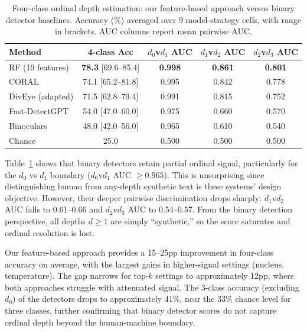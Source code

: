 \documentclass[11pt,a4paper]{article}
\begin{document}
\begin{table}[t]
\centering
\caption{Four-class ordinal depth estimation: our feature-based approach versus binary detector baselines. Accuracy (\%) averaged over 9 model-strategy cells, with range in brackets. AUC columns report mean pairwise AUC.}
\label{tab:detector_comparison}
\small
\begin{tabular}{lcccc}
\toprule
\textbf{Method} & \textbf{4-class Acc} & \textbf{$d_0$v$d_1$ AUC} & \textbf{$d_1$v$d_2$ AUC} & \textbf{$d_2$v$d_3$ AUC} \\
\midrule
RF (19 features)     & \textbf{78.3} {\scriptsize [69.6--85.4]} & \textbf{0.998} & \textbf{0.861} & \textbf{0.801} \\
CORAL               & 74.1 {\scriptsize [65.2--81.8]} & 0.995 & 0.842 & 0.778 \\
DivEye (adapted)    & 71.5 {\scriptsize [62.8--79.4]} & 0.991 & 0.815 & 0.752 \\
Fast-DetectGPT      & 54.0 {\scriptsize [47.0--60.0]} & 0.975 & 0.660 & 0.570 \\
Binoculars          & 48.0 {\scriptsize [42.0--56.0]} & 0.965 & 0.610 & 0.540 \\
Chance              & 25.0 & 0.500 & 0.500 & 0.500 \\
\bottomrule
\end{tabular}
\end{table}

Table~\ref{tab:detector_comparison} shows that binary detectors retain partial ordinal signal, particularly for the $d_0$ vs $d_1$ boundary ($d_0$v$d_1$ AUC $\geq 0.965$). This is unsurprising since distinguishing human from any-depth synthetic text is these systems' design objective. However, their deeper pairwise discrimination drops sharply: $d_1$v$d_2$ AUC falls to 0.61--0.66 and $d_2$v$d_3$ AUC to 0.54--0.57. From the binary detection perspective, all depths $d \geq 1$ are simply ``synthetic,'' so the score saturates and ordinal resolution is lost.

Our feature-based approach provides a 15--25pp improvement in four-class accuracy on average, with the largest gains in higher-signal settings (nucleus, temperature). The gap narrows for top-$k$ settings to approximately 12pp, where both approaches struggle with attenuated signal. The 3-class accuracy (excluding $d_0$) of the detectors drops to approximately 41\%, near the 33\% chance level for three classes, further confirming that binary detector scores do not capture ordinal depth beyond the human-machine boundary.
\end{document}

